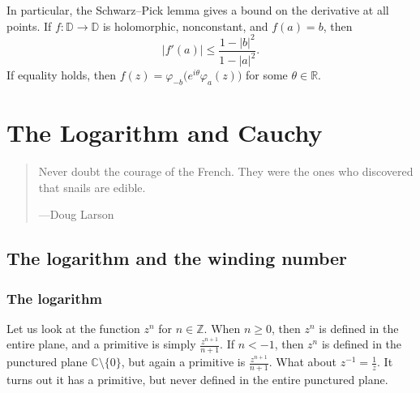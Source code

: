 \documentclass[12pt,openany]{book}
\newcommand{\sabs}[1]{\lvert {#1} \rvert}
\newcommand{\C}{{\mathbb{C}}}
\newcommand{\R}{{\mathbb{R}}}
\newcommand{\Z}{{\mathbb{Z}}}
\newcommand{\D}{{\mathbb{D}}}
\theoremstyle{plain}
\theoremstyle{remark}
\theoremstyle{definition}
\newenvironment{myquote}{%
    \begin{quote}%
    \begingroup\itshape
}{%
    \endgroup%
    \end{quote}
}
\theoremstyle{exercise}
\theoremstyle{example}
\begin{document}
In particular, the Schwarz--Pick lemma gives a bound on the derivative
at all points.  If
$f \colon \D \to \D$ is holomorphic, nonconstant, and $f(a) = b$,
then
\begin{equation*}
\sabs{f'(a)} \leq
\frac{1-\sabs{b}^2}{1-\sabs{a}^2} .
\end{equation*}
If equality holds, then $f(z) = \varphi_{-b}\bigl( e^{i\theta} \varphi_a(z)
\bigr)$ for some $\theta \in \R$.


\chapter{The Logarithm and Cauchy} \label{ch:log}

\begin{myquote}
Never doubt the courage of the French. They were the ones who discovered that snails are edible.

---Doug Larson
\end{myquote}


\section{The logarithm and the winding number}
\label{sec:log}

\subsection{The logarithm}

Let us look at the function $z^n$ for $n \in \Z$.  When $n \geq 0$, 
then $z^n$ is defined in the entire plane, and a primitive is
simply $\frac{z^{n+1}}{n+1}$.  If $n < -1$, then $z^n$ is defined
in the punctured plane $\C \setminus \{0\}$, but again
a primitive is $\frac{z^{n+1}}{n+1}$.  What about $z^{-1} =
\frac{1}{z}$.  It turns out it has a primitive, but never defined in
the entire punctured plane.
\end{document}
